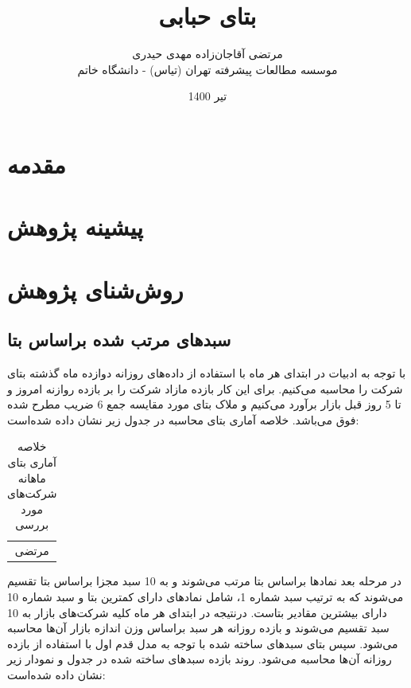 \documentclass[12pt, a4paper]{article}
\title{بتای حبابی }
\author{
	مرتضی آقاجان‌زاده
	 \sym{*} 
	\qquad 
	مهدی حیدری 
	\sym{*} 
	 \\
	\sym{*} 
	\footnotesize  موسسه مطالعات پیشرفته تهران (تیاس) - دانشگاه خاتم
}
\date{
تیر 1400}
\begin{document}
\maketitle

\section{مقدمه}
\section{پیشینه پژوهش}
\section{روش‌شنای پژوهش}
\subsection{سبد‌های مرتب شده براساس بتا}
با توجه به ادبیات در ابتدای هر ماه با استفاده از داده‌های روزانه دوازده ماه گذشته بتای شرکت را محاسبه می‌کنیم. برای این کار بازده مازاد شرکت را بر بازده روازنه امروز و تا 5 روز قبل بازار برآورد می‌کنیم و ملاک بتای مورد مقایسه جمع 6 ضریب مطرح شده فوق می‌باشد. خلاصه آماری بتای محاسبه در جدول زیر نشان داده شده‌است:

\begin{table}[htbp]
	\caption{خلاصه آماری بتای ماهانه شرکت‌های مورد بررسی}
	\label{firstbetasummary}
	\begin{tabular}{c}
		مرتضی 
	\end{tabular}
\end{table}

در مرحله بعد نماد‌ها براساس بتا مرتب می‌شوند و به 10 سبد مجزا براساس بتا تقسیم می‌شوند که به ترتیب سبد شماره 1، شامل نماد‌های دارای کمترین بتا و سبد‌ شماره 10 دارای بیشترین مقادیر بتاست. درنتیجه در ابتدای هر ماه کلیه شرکت‌های بازار به 10 سبد تقسیم می‌شوند و بازده روزانه هر سبد براساس وزن اندازه بازار آن‌ها محاسبه می‌شود. سپس بتای سبد‌های ساخته شده با توجه به مدل قدم اول با استفاده از بازده روزانه آن‌ها محاسبه می‌شود. روند بازده سبد‌های ساخته شده در جدول و نمودار زیر نشان داده شده‌است:
\end{document}
